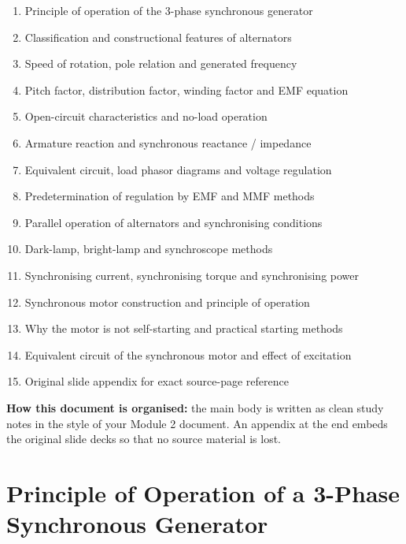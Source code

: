 \documentclass[12pt,a4paper]{article}
\begin{document}
\begin{tcolorbox}[studybox={Topics Covered in This Module}]
\begin{enumerate}[leftmargin=*, label=\textcolor{anthOrange}{\HeadingFont\bfseries\arabic*.}]
  \item Principle of operation of the 3-phase synchronous generator
  \item Classification and constructional features of alternators
  \item Speed of rotation, pole relation and generated frequency
  \item Pitch factor, distribution factor, winding factor and EMF equation
  \item Open-circuit characteristics and no-load operation
  \item Armature reaction and synchronous reactance / impedance
  \item Equivalent circuit, load phasor diagrams and voltage regulation
  \item Predetermination of regulation by EMF and MMF methods
  \item Parallel operation of alternators and synchronising conditions
  \item Dark-lamp, bright-lamp and synchroscope methods
  \item Synchronising current, synchronising torque and synchronising power
  \item Synchronous motor construction and principle of operation
  \item Why the motor is not self-starting and practical starting methods
  \item Equivalent circuit of the synchronous motor and effect of excitation
  \item Original slide appendix for exact source-page reference
\end{enumerate}
\end{tcolorbox}

\vspace{0.8cm}
\begin{notebox}
\textbf{How this document is organised:} the main body is written as clean study notes in the
style of your Module 2 document. An appendix at the end embeds the original slide decks so
that no source material is lost.
\end{notebox}

\newpage
\setcounter{page}{1}
\tableofcontents
\newpage

\section{Principle of Operation of a 3-Phase Synchronous Generator}
\end{document}
